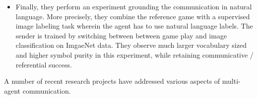 \begin{itemize}
	\item Finally, they perform an experiment grounding the communication in natural language. More precisely, they combine the reference game with a supervised image labeling task wherein the agent has to use natural language labels. The sender is trained by switching between between game play and image classification on ImgaeNet data. They observe much larger vocabulary sized and higher symbol purity in this experiment, while retaining communicative / referential success. 
	
\end{itemize}

A number of recent research projects have addressed various aspects of multi-agent communication.  